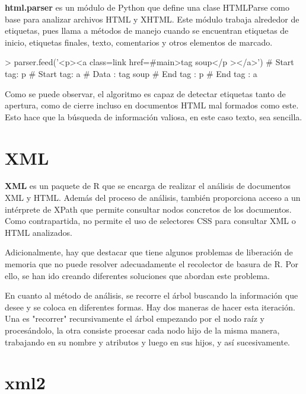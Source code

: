 \textbf{html.parser} \cite{html-parser} es un módulo de Python que define una clase HTMLParse como base 
para analizar archivos HTML y XHTML. Este módulo trabaja alrededor de etiquetas, pues llama a métodos de 
manejo cuando se encuentran etiquetas de inicio, etiquetas finales, texto, comentarios y otros elementos 
de marcado.

\begin{Schunk}
    \begin{Soutput}
        > parser.feed('<p><a class=link href=#main>tag soup</p ></a>')
        # Start tag: p
        # Start tag: a
        # Data     : tag soup
        # End tag  : p
        # End tag  : a
    \end{Soutput}
\end{Schunk}

Como se puede observar, el algoritmo es capaz de detectar etiquetas tanto de apertura, como de cierre incluso
en documentos HTML mal formados como este. Esto hace que la búsqueda de información valiosa, en este caso
texto, sea sencilla.

\section{XML}
\label{sec:xml}

\textbf{XML} \cite{xml-cran} es un paquete de R que se encarga de realizar el análisis de documentos XML
y HTML. Además del proceso de análisis, también proporciona acceso a un intérprete de XPath que permite
consultar nodos concretos de los documentos. Como contrapartida, no permite el uso de selectores CSS para
consultar XML o HTML analizados.

Adicionalmente, hay que destacar que tiene algunos problemas de liberación de memoria que no puede resolver
adecuadamente el recolector de basura de R. Por ello, se han ido creando diferentes soluciones que abordan
este problema.

En cuanto al método de análisis, se recorre el árbol buscando la información que desee y se coloca en 
diferentes formas. Hay dos maneras de hacer esta iteración. Una es "recorrer" recursivamente el árbol 
empezando por el nodo raíz y procesándolo, la otra consiste procesar cada nodo hijo de la misma manera, 
trabajando en su nombre y atributos y luego en sus hijos, y así sucesivamente.


\section{xml2}
\label{sec:xml2}

